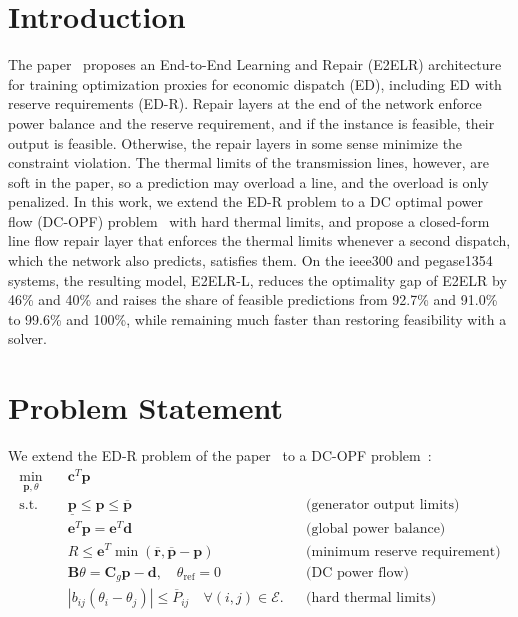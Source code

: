 \documentclass[12pt]{article}
\begin{document}
\section{Introduction}
The paper~\cite{Chen2023_E2ELR} proposes an End-to-End Learning and Repair (E2ELR) architecture for training optimization proxies for economic dispatch (ED), including ED with reserve requirements (ED-R).
Repair layers at the end of the network enforce power balance and the reserve requirement, and if the instance is feasible, their output is feasible.
Otherwise, the repair layers in some sense minimize the constraint violation.
The thermal limits of the transmission lines, however, are soft in the paper, so a prediction may overload a line, and the overload is only penalized.
In this work, we extend the ED-R problem to a DC optimal power flow (DC-OPF) problem~\cite{Stott2009_DCPF} with hard thermal limits, and propose a closed-form line flow repair layer that enforces the thermal limits whenever a second dispatch, which the network also predicts, satisfies them.
On the ieee300 and pegase1354 systems, the resulting model, E2ELR-L, reduces the optimality gap of E2ELR by 46\% and 40\% and raises the share of feasible predictions from 92.7\% and 91.0\% to 99.6\% and 100\%, while remaining much faster than restoring feasibility with a solver.


\section{Problem Statement}

We extend the ED-R problem of the paper~\cite{Chen2023_E2ELR} to a DC-OPF problem~\cite{Stott2009_DCPF}:
\begin{align}
    \min_{\boldsymbol{p}, \theta} \quad & \boldsymbol{c}^T \boldsymbol{p} \\
    \text{s.t.} \quad
    & \underline{\boldsymbol{p}} \leq \boldsymbol{p} \leq \overline{\boldsymbol{p}}
      && \text{(generator output limits)} \label{eq:r_plim} \\
    & \mathbf{e}^T \boldsymbol{p} = \mathbf{e}^T \boldsymbol{d}
      && \text{(global power balance)} \label{eq:r_pb} \\
    & R \leq \mathbf{e}^T \min(\overline{\boldsymbol{r}}, \overline{\boldsymbol{p}} - \boldsymbol{p})
      && \text{(minimum reserve requirement)} \label{eq:r_res} \\
    & \boldsymbol{B} \theta = \boldsymbol{C}_g \boldsymbol{p} - \boldsymbol{d}, \quad \theta_{\text{ref}} = 0
      && \text{(DC power flow)} \label{eq:r_dcpf} \\
    & |b_{ij} (\theta_i - \theta_j)| \leq \overline{P}_{ij}
      \quad \forall (i,j) \in \mathcal{E}.
      && \text{(hard thermal limits)} \label{eq:r_th}
\end{align}
\end{document}
